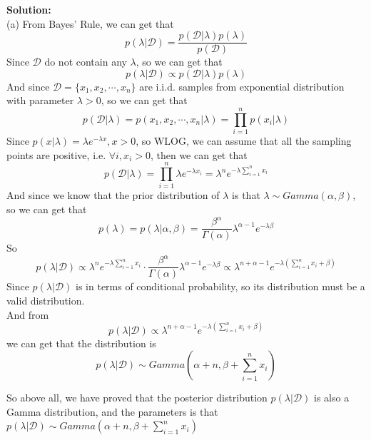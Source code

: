 \documentclass[10pt]{article}
\begin{document}
\begin{enumerate}[1.]
      	  \textbf{Solution:}\\
		  (a) From Bayes' Rule, we can get that
		  $$p(\lambda|\mathcal{D})=\dfrac{p(\mathcal{D}|\lambda)p(\lambda)}{p(\mathcal{D})}$$
		  Since $\mathcal{D}$ do not contain any $\lambda$, so we can get that
		  $$p(\lambda|\mathcal{D})\propto p(\mathcal{D}|\lambda)p(\lambda)$$
		  And since $\mathcal{D}=\{x_1,x_2,\cdots,x_n\}$ are i.i.d. samples from exponential distribution with parameter $\lambda > 0$, so we can get that
		  $$p(\mathcal{D}|\lambda)=p(x_1,x_2,\cdots,x_n|\lambda)=\prod\limits_{i=1}^np(x_i|\lambda)$$
		  Since $p(x|\lambda)=\lambda e^{-\lambda x},x>0$, so WLOG, we can assume that all the sampling points are positive,
		  i.e. $\forall i, x_i>0$, then we can get that
		  $$p(\mathcal{D}|\lambda)=\prod\limits_{i=1}^n\lambda e^{-\lambda x_i}=\lambda^n e^{-\lambda\sum\limits_{i=1}^nx_i}$$
		  And since we know that the prior distribution of $\lambda$ is that $\lambda\sim Gamma(\alpha,\beta)$,
		  so we can get that
		  $$p(\lambda)=p(\lambda|\alpha,\beta)=\dfrac{\beta^{\alpha}}{\Gamma(\alpha)} \lambda^{\alpha-1}e^{-\lambda\beta}$$
		  So
		  $$p(\lambda|\mathcal{D})\propto \lambda^n e^{-\lambda\sum\limits_{i=1}^nx_i}\cdot\dfrac{\beta^{\alpha}}{\Gamma(\alpha)} \lambda^{\alpha-1}e^{-\lambda\beta}\propto\lambda^{n+\alpha-1}e^{-\lambda(\sum\limits_{i=1}^nx_i+\beta)}$$
		  Since $p(\lambda|\mathcal{D})$ is in terms of conditional probability, so its distribution must be a valid distribution.\\
		  And from $$p(\lambda|\mathcal{D})\propto\lambda^{n+\alpha-1}e^{-\lambda(\sum\limits_{i=1}^nx_i+\beta)}$$
		  we can get that the distribution is $$p(\lambda|\mathcal{D})\sim Gamma(\alpha+n,\beta+\sum\limits_{i=1}^nx_i)$$

		  So above all, we have proved that the posterior distribution $p(\lambda|\mathcal{D})$ is also a Gamma distribution, 
		  and the parameters is that $p(\lambda|\mathcal{D})\sim Gamma(\alpha+n,\beta+\sum\limits_{i=1}^nx_i)$


\end{enumerate}
\end{document}
